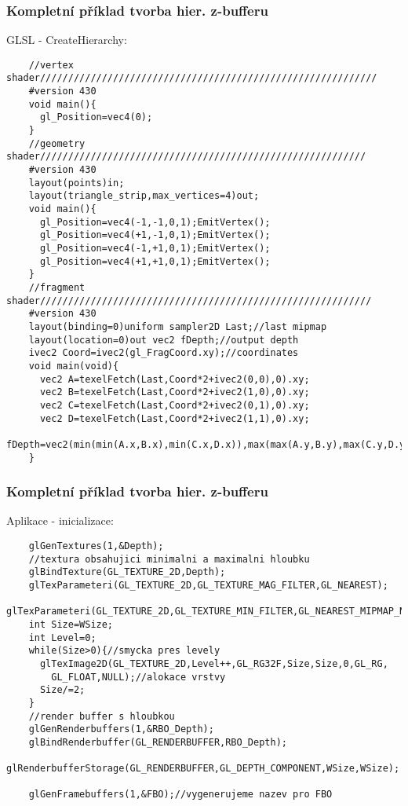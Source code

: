 \begin{frame}[fragile]
\frametitle{Kompletní příklad tvorba hier. z-bufferu}
  \begin{itemize}
    GLSL - CreateHierarchy:
    {\tiny
    \begin{verbatim}
    //vertex shader////////////////////////////////////////////////////////////
    #version 430
    void main(){
      gl_Position=vec4(0);
    }
    //geometry shader//////////////////////////////////////////////////////////
    #version 430
    layout(points)in;
    layout(triangle_strip,max_vertices=4)out;
    void main(){
      gl_Position=vec4(-1,-1,0,1);EmitVertex();
      gl_Position=vec4(+1,-1,0,1);EmitVertex();
      gl_Position=vec4(-1,+1,0,1);EmitVertex();
      gl_Position=vec4(+1,+1,0,1);EmitVertex();
    }
    //fragment shader///////////////////////////////////////////////////////////
    #version 430
    layout(binding=0)uniform sampler2D Last;//last mipmap
    layout(location=0)out vec2 fDepth;//output depth
    ivec2 Coord=ivec2(gl_FragCoord.xy);//coordinates
    void main(void){
      vec2 A=texelFetch(Last,Coord*2+ivec2(0,0),0).xy;
      vec2 B=texelFetch(Last,Coord*2+ivec2(1,0),0).xy;
      vec2 C=texelFetch(Last,Coord*2+ivec2(0,1),0).xy;
      vec2 D=texelFetch(Last,Coord*2+ivec2(1,1),0).xy;
      fDepth=vec2(min(min(A.x,B.x),min(C.x,D.x)),max(max(A.y,B.y),max(C.y,D.y)));
    }
    \end{verbatim}
    }
  \end{itemize}
\end{frame}

\begin{frame}[fragile]
\frametitle{Kompletní příklad tvorba hier. z-bufferu}
  \begin{itemize}
    Aplikace - inicializace:
    {\scriptsize
    \begin{verbatim}
    glGenTextures(1,&Depth);
    //textura obsahujici minimalni a maximalni hloubku
    glBindTexture(GL_TEXTURE_2D,Depth);
    glTexParameteri(GL_TEXTURE_2D,GL_TEXTURE_MAG_FILTER,GL_NEAREST);
    glTexParameteri(GL_TEXTURE_2D,GL_TEXTURE_MIN_FILTER,GL_NEAREST_MIPMAP_NEAREST);
    int Size=WSize;
    int Level=0;
    while(Size>0){//smycka pres levely
      glTexImage2D(GL_TEXTURE_2D,Level++,GL_RG32F,Size,Size,0,GL_RG,
        GL_FLOAT,NULL);//alokace vrstvy
      Size/=2;
    }
    //render buffer s hloubkou
    glGenRenderbuffers(1,&RBO_Depth);
    glBindRenderbuffer(GL_RENDERBUFFER,RBO_Depth);
    glRenderbufferStorage(GL_RENDERBUFFER,GL_DEPTH_COMPONENT,WSize,WSize);

    glGenFramebuffers(1,&FBO);//vygenerujeme nazev pro FBO
    \end{verbatim}
    }
  \end{itemize}
\end{frame}

